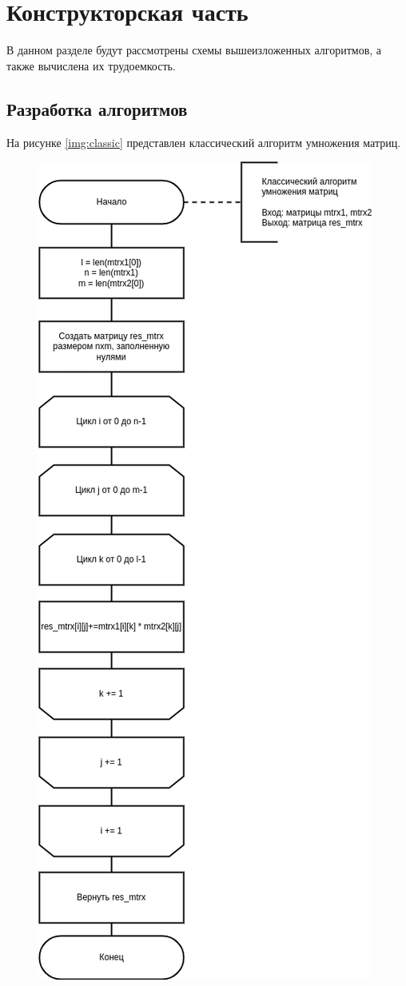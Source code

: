 \chapter{Конструкторская часть}

В данном разделе будут рассмотрены схемы вышеизложенных алгоритмов, а также вычислена их трудоемкость.

\section{Разработка алгоритмов}

На рисунке \ref{img:classic} представлен классический алгоритм умножения матриц.

\begin{figure}[H]
	\begin{center}
		\includegraphics[scale=0.61]{img/classic.png}

\end{center}
\end{figure}
